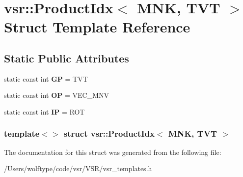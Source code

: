 \hypertarget{structvsr_1_1_product_idx_3_01_m_n_k_00_01_t_v_t_01_4}{\section{vsr\-:\-:Product\-Idx$<$ M\-N\-K, T\-V\-T $>$ Struct Template Reference}
\label{structvsr_1_1_product_idx_3_01_m_n_k_00_01_t_v_t_01_4}
}
\subsection*{Static Public Attributes}
\begin{DoxyCompactItemize}
\item 
\hypertarget{structvsr_1_1_product_idx_3_01_m_n_k_00_01_t_v_t_01_4_a98ab910152da23999a6d7316cd58f9cb}{static const int {\bfseries G\-P} = T\-V\-T}\label{structvsr_1_1_product_idx_3_01_m_n_k_00_01_t_v_t_01_4_a98ab910152da23999a6d7316cd58f9cb}

\item 
\hypertarget{structvsr_1_1_product_idx_3_01_m_n_k_00_01_t_v_t_01_4_ae70ba6f9c455cca557cebba3742d5db3}{static const int {\bfseries O\-P} = V\-E\-C\-\_\-\-M\-N\-V}\label{structvsr_1_1_product_idx_3_01_m_n_k_00_01_t_v_t_01_4_ae70ba6f9c455cca557cebba3742d5db3}

\item 
\hypertarget{structvsr_1_1_product_idx_3_01_m_n_k_00_01_t_v_t_01_4_a9c2a4b15e7ae06be4957f0aa00a3dca2}{static const int {\bfseries I\-P} = R\-O\-T}\label{structvsr_1_1_product_idx_3_01_m_n_k_00_01_t_v_t_01_4_a9c2a4b15e7ae06be4957f0aa00a3dca2}

\end{DoxyCompactItemize}
\subsubsection*{template$<$$>$ struct vsr\-::\-Product\-Idx$<$ M\-N\-K, T\-V\-T $>$}



The documentation for this struct was generated from the following file\-:\begin{DoxyCompactItemize}
\item 
/\-Users/wolftype/code/vsr/\-V\-S\-R/vsr\-\_\-templates.\-h\end{DoxyCompactItemize}
